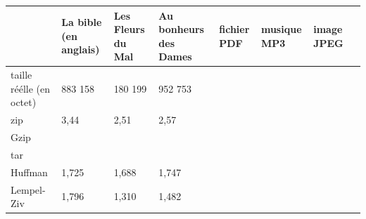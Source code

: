 \documentclass{report}
\begin{document}
\begin{center}
{\renewcommand{\arraystretch}{2}
\begin{tabular}{|p{1.5cm}|p{1.5cm}|p{1.5cm}|p{1.5cm}|p{1.5cm}|p{1.5cm}|p{1.5cm}|p{1.5cm}|}
\hline
 & La bible (en anglais)  & Les Fleurs du Mal  & Au bonheurs des Dames & fichier PDF & musique  MP3 & image JPEG  \\
\hline
taille réélle (en octet)  & 883 158 & 180 199 & 952 753 &  & & \\\hline
zip & 3,44  & 2,51 & 2,57 & & & \\
\hline
Gzip & & & & & & \\
\hline
tar & & & & & & \\
\hline
Huffman & 1,725 & 1,688 & 1,747 & & & \\
\hline
Lempel-Ziv & 1,796 & 1,310 & 1,482 & & & \\
\hline

\end{tabular}
}
\end{center}
\end{document}
